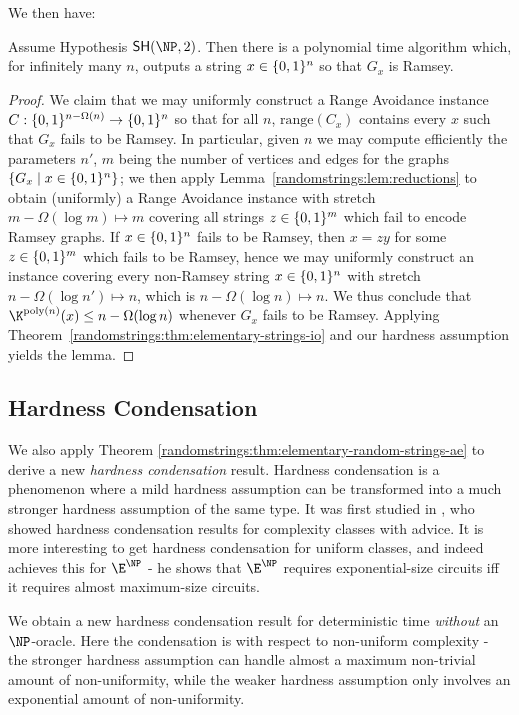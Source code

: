 We then have:
\begin{lemma}
Assume Hypothesis $\SH(\NP,2)$. Then there is a polynomial time algorithm which, for infinitely many $n$, outputs a string $x \in \{0,1\}^n$ so that $G_x$ is Ramsey.
\end{lemma}
\begin{proof}
We claim that we may uniformly construct a Range Avoidance instance $C: \{0,1\}^{n - \Omega(n)} \to \{0,1\}^n$ so that for all $n$, $\mathrm{range}(C_x)$ contains every $x$ such that $G_x$ fails to be Ramsey. In particular, given $n$ we may compute efficiently the parameters $n'$, $m$ being the number of vertices and edges for the graphs $\{G_x \mid x \in \{0,1\}^n\}$; we then apply Lemma~\ref{randomstrings:lem:reductions} to obtain (uniformly) a Range Avoidance instance with stretch $m- \Omega(\log m) \mapsto m$ covering all strings $z \in \{0,1\}^m$ which fail to encode Ramsey graphs. If $x \in \{0,1\}^n$ fails to be Ramsey, then $x = z y$ for some $z \in \{0,1\}^m$ which fails to be Ramsey, hence we may uniformly construct an \avoid instance covering every non-Ramsey string $x \in \{0,1\}^n$ with stretch $n - \Omega(\log n') \mapsto n$, which is $n - \Omega(\log n) \mapsto n$.
We thus conclude that $\K^{\poly(n)}(x) \leq n - \Omega(\log n)$ whenever $G_x$ fails to be Ramsey. Applying Theorem~\ref{randomstrings:thm:elementary-strings-io} and our hardness assumption yields the lemma.
\end{proof}

\subsection{Hardness Condensation}\label{randomstrings:subsec:condense}

We also apply Theorem \ref{randomstrings:thm:elementary-random-strings-ae} to derive a new {\it hardness condensation} result. Hardness condensation is a phenomenon where a mild hardness assumption can be transformed into a much stronger hardness assumption of the same type. It was first studied in \cite{BOS06}, who showed hardness condensation results for complexity classes with advice. It is more interesting to get hardness condensation for uniform classes, and indeed \cite{Korten21} achieves this for $\E^{\NP}$ - he shows that $\E^{\NP}$ requires exponential-size circuits iff it requires almost maximum-size circuits. 

We obtain a new hardness condensation result for deterministic time {\it without} an $\NP$-oracle. Here the condensation is with respect to non-uniform complexity - the stronger hardness assumption can handle almost a maximum non-trivial amount of non-uniformity, while the weaker hardness assumption only involves an exponential amount of non-uniformity.

